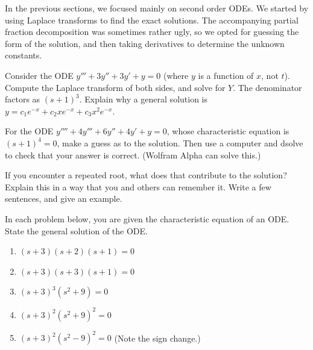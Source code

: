 In the previous sections, we focused mainly on second order ODEs.  We started by using Laplace transforms to find the exact solutions.  The accompanying partial fraction decomposition was sometimes rather ugly, so we opted for guessing the form of the solution, and then taking derivatives to determine the unknown constants. 

\begin{problem}
 Consider the ODE $y'''+3y''+3y'+y=0$ (where $y$ is a function of $x$, not $t$).  Compute the Laplace transform of both sides, and solve for $Y$.  The denominator factors as $(s+1)^3$. Explain why a general solution is $y = c_1 e^{-x}+c_2 x e^{-x}+c_3 x^2e^{-x}.$ 

 For the ODE $y''''+4y'''+6y''+4y'+y=0$, whose characteristic equation is $(s+1)^4=0$, make a guess as to the solution. Then use a computer and dsolve to check that your answer is correct. (Wolfram Alpha can solve this.)

 If you encounter a repeated root, what does that contribute to the solution? Explain this in a way that you and others can remember it. Write a few sentences, and give an example. 
\end{problem}




\begin{problem}
 In each problem below, you are given the characteristic equation of an ODE. State the general solution of the ODE.
\begin{enumerate}
 \item $(s+3)(s+2)(s+1)=0$
 \item $(s+3)(s+3)(s+1)=0$
 \item $(s+3)^3(s^2+9)=0$
 \item $(s+3)^2(s^2+9)^2=0$
 \item $(s+3)^2(s^2-9)^2=0$ (Note the sign change.)
\end{enumerate}
\end{problem}





